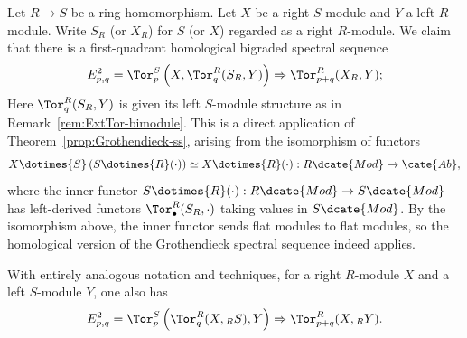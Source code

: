 \begin{example}\label{eg:change-of-rings-SS}
	Let $R\to S$ be a ring homomorphism. Let $X$ be a right $S$-module and
	$Y$ a left $R$-module. Write $S_R$ (or $X_R$) for $S$ (or $X$) regarded as
	a right $R$-module. We claim that there is a first-quadrant homological
	bigraded spectral sequence
	\begin{gather*}
		E^2_{p,q} = \Tor^S_p\left( X, \Tor^R_q(S_R, Y) \right) \Rightarrow \Tor^R_{p+q}(X_R, Y);
	\end{gather*}
	Here $\Tor^R_q(S_R,Y)$ is given its left $S$-module structure as in
	Remark~\ref{rem:ExtTor-bimodule}. This is a direct application of
	Theorem~\ref{prop:Grothendieck-ss}, arising from the isomorphism of functors
	\[ X \dotimes{S} \left( S \dotimes{R} (\cdot) \right) \simeq X \dotimes{R} (\cdot) : R\dcate{Mod} \to \cate{Ab}, \]
	where the inner functor
	$S\dotimes{R}(\cdot):R\dcate{Mod}\to S\dcate{Mod}$ has left-derived
	functors $\Tor^R_\bullet(S_R,\cdot)$ taking values in $S\dcate{Mod}$.
	By the isomorphism above, the inner functor sends flat modules to flat
	modules, so the homological version of the Grothendieck spectral sequence
	indeed applies.

	With entirely analogous notation and techniques, for a right $R$-module
	$X$ and a left $S$-module $Y$, one also has
	\[ E^2_{p,q} = \Tor^S_p\left( \Tor^R_q(X, {}_R S), Y \right) \Rightarrow \Tor^R_{p+q}(X, {}_R Y). \]


\end{example}
